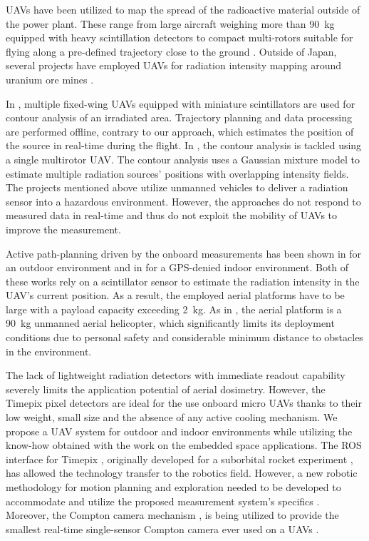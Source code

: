 \documentclass[a4paper,11pt,titlepage,twoside]{book}
\begin{document}
\acp{UAV} have been utilized to map the spread of the radioactive material outside of the power plant.
These range from large aircraft weighing more than \SI{90}{\kilogram} equipped with heavy scintillation detectors \cite{sanada2015aerial, towler2012radiation, jiang2016prototype}
to compact multi-rotors suitable for flying along a pre-defined trajectory close to the ground \cite{macfarlane2014lightweight, christie2017radiation, martin20163d}.
Outside of Japan, several projects have employed \acp{UAV} for radiation intensity mapping around uranium ore mines \cite{salek2018mapping, keatley2018source, martin2015use}.

In \cite{han2013lowcost}, multiple fixed-wing \acp{UAV} equipped with miniature scintillators are used for contour analysis of an irradiated area.
Trajectory planning and data processing are performed offline, contrary to our approach, which estimates the position of the source in real-time during the flight.
In \cite{newaz2016uav}, the contour analysis is tackled using a single multirotor \ac{UAV}. The contour analysis uses a Gaussian mixture model to estimate multiple radiation sources' positions with overlapping intensity fields.
The projects mentioned above utilize unmanned vehicles to deliver a radiation sensor into a hazardous environment.
However, the approaches do not respond to measured data in real-time and thus do not exploit the mobility of \acp{UAV} to improve the measurement.

Active path-planning driven by the onboard measurements has been shown in \cite{towler2012radiation} for an outdoor environment and in \cite{mascarich2018radiation} for a GPS-denied indoor environment.
Both of these works rely on a scintillator sensor to estimate the radiation intensity in the \ac{UAV}'s current position.
As a result, the employed aerial platforms have to be large with a payload capacity exceeding \SI{2}{\kilogram}.
As in \cite{towler2012radiation}, the aerial platform is a \SI{90}{\kilogram} unmanned aerial helicopter, which significantly limits its deployment conditions due to personal safety and considerable minimum distance to obstacles in the environment.

The lack of lightweight radiation detectors with immediate readout capability severely limits the application potential of aerial dosimetry.
However, the Timepix pixel detectors are ideal for the use onboard micro \acp{UAV} thanks to their low weight, small size and the absence of any active cooling mechanism.
We propose a \ac{UAV} system for outdoor and indoor environments while utilizing the know-how obtained with the work on the embedded space applications.
The \ac{ROS} interface for Timepix \cite{baca2018rospix}, originally developed for a suborbital rocket experiment \cite{urban2020rex}, has allowed the technology transfer to the robotics field.
However, a new robotic methodology for motion planning and exploration needed to be developed to accommodate and utilize the proposed measurement system's specifics \cite{stibinger2020localization}.
Moreover, the Compton camera mechanism \cite{turecek2018compton}, is being utilized to provide the smallest real-time single-sensor Compton camera ever used on a \acp{UAV} \cite{baca2020gamma}.
\end{document}
